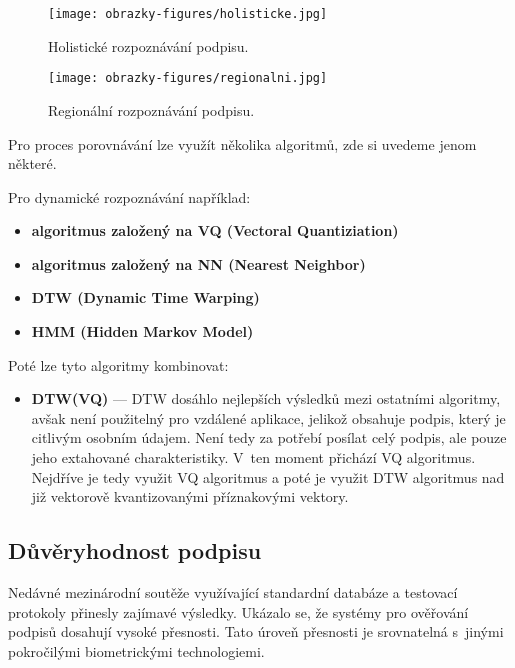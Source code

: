 \begin{figure}[H]
  \centering
  \begin{minipage}{1\textwidth}
      \centering
      \texttt{[image: obrazky-figures/holisticke.jpg]}
      \caption{Holistické rozpoznávání podpisu.~\cite{DrahanskýMartin2011}}
      \label{fig:holisticke_rozpoznavani}
  \end{minipage}\hfill
  \begin{minipage}{1\textwidth}
      \centering
      \texttt{[image: obrazky-figures/regionalni.jpg]}
      \caption{Regionální rozpoznávání podpisu.~\cite{DrahanskýMartin2011}}
      \label{fig:geometricka_normalizace}
  \end{minipage}
\end{figure}
\noindent
Pro proces porovnávání lze využít několika algoritmů, zde si uvedeme jenom některé.
\newline

\noindent
Pro dynamické rozpoznávání například:
\begin{itemize}
  \item \textbf{algoritmus založený na VQ (Vectoral Quantiziation)}
  \item \textbf{algoritmus založený na NN (Nearest Neighbor)}
  \item \textbf{DTW (Dynamic Time Warping)}
  \item \textbf{HMM (Hidden Markov Model)}
\end{itemize}
Poté lze tyto algoritmy kombinovat:
\begin{itemize}
  \item \textbf{DTW(VQ)} --- DTW dosáhlo nejlepších výsledků mezi ostatními algoritmy, avšak není použitelný pro vzdálené aplikace, jelikož obsahuje podpis, který je citlivým osobním údajem.
  Není tedy za potřebí posílat celý podpis, ale pouze jeho extahované charakteristiky.
  V~ten moment přichází VQ algoritmus. Nejdříve je tedy využit VQ algoritmus a poté je využit DTW algoritmus nad již vektorově kvantizovanými příznakovými vektory.~\cite{Jain2006}
\end{itemize}

\subsection*{Důvěryhodnost podpisu}
Nedávné mezinárodní soutěže využívající standardní databáze a testovací protokoly přinesly zajímavé výsledky. %
Ukázalo se, že systémy pro ověřování podpisů dosahují vysoké přesnosti.                                       %
Tato úroveň přesnosti je srovnatelná s~jinými pokročilými biometrickými technologiemi.~\cite{Impedovo2008}    %

